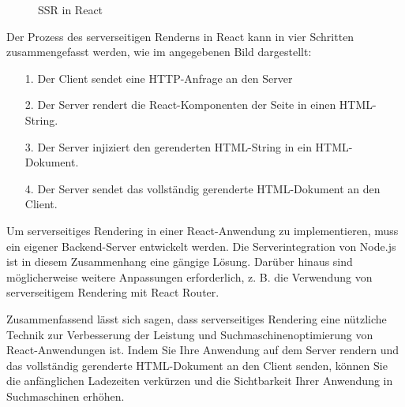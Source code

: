 \begin{figure}[htbp]
	\centering
	\caption{SSR in React}
\end{figure}
Der Prozess des serverseitigen Renderns in React kann in vier Schritten zusammengefasst werden, wie im angegebenen Bild dargestellt:\\
\begin{itemize}
	\item[1.] {Der Client sendet eine HTTP-Anfrage an den Server}
	\item[2.]  {Der Server rendert die React-Komponenten der Seite in einen HTML-String.}
	\item[3.]  {Der Server injiziert den gerenderten HTML-String in ein HTML-Dokument.}
	\item[4.]  {Der Server sendet das vollständig gerenderte HTML-Dokument an den Client.}
\end{itemize}
Um serverseitiges Rendering in einer React-Anwendung zu implementieren, muss ein eigener Backend-Server entwickelt werden. Die Serverintegration von Node.js ist in diesem Zusammenhang eine gängige Lösung. Darüber hinaus sind möglicherweise weitere Anpassungen erforderlich, z. B. die Verwendung von serverseitigem Rendering mit React Router. \cite{Drehmanns2021}

Zusammenfassend lässt sich sagen, dass serverseitiges Rendering eine nützliche Technik zur Verbesserung der Leistung und Suchmaschinenoptimierung von React-Anwendungen ist. Indem Sie Ihre Anwendung auf dem Server rendern und das vollständig gerenderte HTML-Dokument an den Client senden, können Sie die anfänglichen Ladezeiten verkürzen und die Sichtbarkeit Ihrer Anwendung in Suchmaschinen erhöhen.

